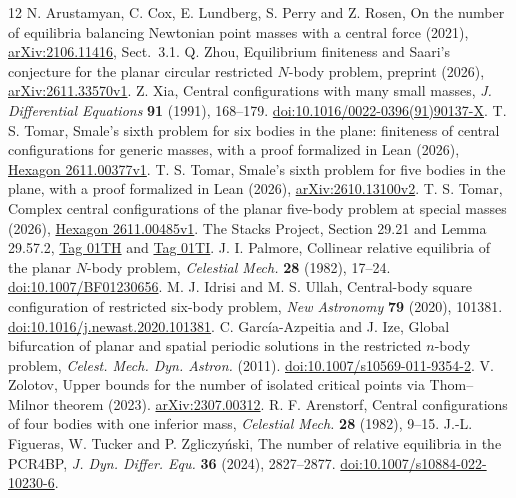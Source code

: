\documentclass[11pt]{article}
\begin{document}
\begin{thebibliography}{12}
 N. Arustamyan, C. Cox, E. Lundberg, S. Perry and Z. Rosen, On the number of equilibria balancing Newtonian point masses with a central force (2021), \href{https://arxiv.org/abs/2106.11416}{arXiv:2106.11416}, Sect.~3.1.
 Q. Zhou, Equilibrium finiteness and Saari's conjecture for the planar circular restricted $N$-body problem, preprint (2026), \href{https://arxiv.org/abs/2611.33570v1}{arXiv:2611.33570v1}.
 Z. Xia, Central configurations with many small masses, \emph{J. Differential Equations} \textbf{91} (1991), 168--179. \href{https://doi.org/10.1016/0022-0396(91)90137-X}{doi:10.1016/0022-0396(91)90137-X}.
 T. S. Tomar, Smale's sixth problem for six bodies in the plane: finiteness of central configurations for generic masses, with a proof formalized in Lean (2026), \href{https://hexagonmath.org/2611.00377v1}{Hexagon 2611.00377v1}.
 T. S. Tomar, Smale's sixth problem for five bodies in the plane, with a proof formalized in Lean (2026), \href{https://arxiv.org/abs/2610.13100v2}{arXiv:2610.13100v2}.
 T. S. Tomar, Complex central configurations of the planar five-body problem at special masses (2026), \href{https://hexagonmath.org/2611.00485v1}{Hexagon 2611.00485v1}.
 The Stacks Project, Section 29.21 and Lemma 29.57.2, \href{https://stacks.math.columbia.edu/tag/01TH}{Tag 01TH} and \href{https://stacks.math.columbia.edu/tag/01TI}{Tag 01TI}.
 J. I. Palmore, Collinear relative equilibria of the planar $N$-body problem, \emph{Celestial Mech.} \textbf{28} (1982), 17--24. \href{https://doi.org/10.1007/BF01230656}{doi:10.1007/BF01230656}.
 M. J. Idrisi and M. S. Ullah, Central-body square configuration of restricted six-body problem, \emph{New Astronomy} \textbf{79} (2020), 101381. \href{https://doi.org/10.1016/j.newast.2020.101381}{doi:10.1016/j.newast.2020.101381}.
 C. Garc\'ia-Azpeitia and J. Ize, Global bifurcation of planar and spatial periodic solutions in the restricted $n$-body problem, \emph{Celest. Mech. Dyn. Astron.} (2011). \href{https://doi.org/10.1007/s10569-011-9354-2}{doi:10.1007/s10569-011-9354-2}.
 V. Zolotov, Upper bounds for the number of isolated critical points via Thom--Milnor theorem (2023). \href{https://arxiv.org/abs/2307.00312}{arXiv:2307.00312}.
 R. F. Arenstorf, Central configurations of four bodies with one inferior mass, \emph{Celestial Mech.} \textbf{28} (1982), 9--15.
 J.-L. Figueras, W. Tucker and P. Zgliczyński, The number of relative equilibria in the PCR4BP, \emph{J. Dyn. Differ. Equ.} \textbf{36} (2024), 2827--2877. \href{https://doi.org/10.1007/s10884-022-10230-6}{doi:10.1007/s10884-022-10230-6}.
\end{thebibliography}
\end{document}
